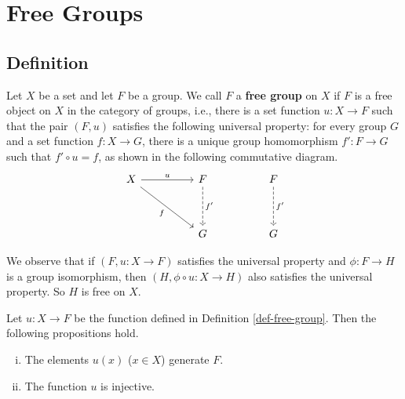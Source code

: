 \section{Free Groups}
\subsection{Definition}
\begin{definition} \label{def-free-group}
	Let $X$ be a set and let $F$ be a group. We call $F$ a \textbf{free group} on $X$ if $F$ is a free object on $X$ in the category of groups, i.e., there is a set function $u:X\rightarrow F$ such that the pair $(F,u)$ satisfies the following universal property: for every group $G$ and a set function $f:X\rightarrow G$, there is a unique group homomorphism $f':F\rightarrow G$ such that $f'\circ u = f$, as shown in the following commutative diagram.
	\[\begin{tikzcd}
		X && F && F \\
		\\
		&& G && G
		\arrow["u", from=1-1, to=1-3]
		\arrow["f"', from=1-1, to=3-3]
		\arrow["{f'}", dashed, from=1-3, to=3-3]
		\arrow["{f'}", dashed, from=1-5, to=3-5]
	\end{tikzcd}\]
\end{definition}
\begin{remark}
	We observe that if $(F,u:X\to F)$ satisfies the universal property and $\phi:F\to H$ is a group isomorphism, then $(H,\phi\circ u:X\to H)$ also satisfies the universal property. So $H$ is  free on $X$.
\end{remark}
\begin{proposition}
	Let $u:X\rightarrow F$ be the function defined in Definition \ref{def-free-group}. Then the following propositions hold.
	\begin{enumerate}[(i)]
		\item The elements $u(x)$ ($x\in X$) generate $F$.
		\item The function $u$ is injective.
	\end{enumerate}
\end{proposition}

